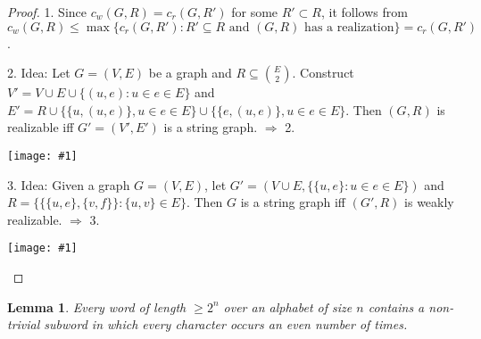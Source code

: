 \documentclass[12pt]{article}
\theoremstyle{plain} %
\newtheorem{lemma}[theorem]{Lemma}
\newcommand{\set}[1]{\{#1\}}
\newcommand{\image}[1]{\begin{center}\texttt{[image: \#1]}\end{center}}
\begin{document}
\begin{proof}
1. Since \(c_w(G, R) = c_r(G, R')\) for some \(R' \subset R\), it follows from \(c_w(G, R) \leq \max\set{c_r(G, R'): R' \subseteq R \text{ and } (G,R) \text{ has a realization}} = c_r(G, R') \).

2. Idea: Let \(G = (V, E)\) be a graph and \(R \subseteq \binom{E}{2}\). Construct \(V' = V \cup E \cup \set{(u, e) : u \in e \in E}\) 
and \(E' = R \cup \set{ \set{u, (u,e)}, u \in e \in E} \cup \set{\set{e, (u,e)}, u\in e \in E}\). Then \((G, R)\) is realizable iff 
\(G' = (V', E')\) is a string graph. \(\Rightarrow \) 2.

\image{images/figure-2.jpeg}

3. Idea: Given a graph \(G = (V, E)\), let \(G' = (V \cup E, \set{\set{u,e} : u \in e \in E})\) and 
\(R = \set{\set{\set{u,e}, \set{v,f}} : \set{u,v} \in E}\). Then \(G\) is a string graph iff \((G', R)\) 
is weakly realizable. \(\Rightarrow \) 3.

\image{images/figure-3.jpeg}
\end{proof}

\begin{lemma}\label{lem:even-occurences}
    Every word of length \(\geq 2^n\) over an alphabet of size \(n\) contains a non-trivial subword in which every character occurs an even number of times.
\end{lemma}
\end{document}
